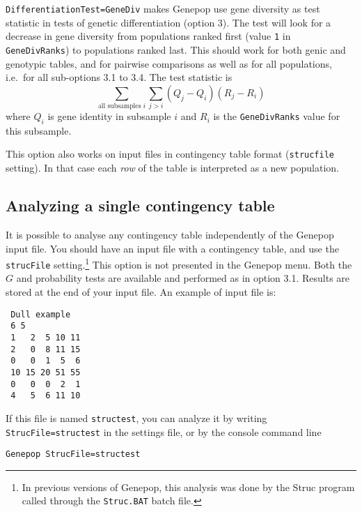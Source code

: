 \documentclass[
  12pt,
]{book}
\begin{document}
\texttt{DifferentiationTest=GeneDiv} makes Genepop use gene diversity as test statistic in tests of genetic differentiation (option 3). The test will look for a decrease in gene diversity from populations ranked first (value \texttt{1} in \texttt{GeneDivRanks}) to populations ranked last. This should work for both genic and genotypic tables, and for pairwise comparisons as well as for all populations, i.e.~for all sub-options 3.1 to 3.4. The test statistic is
\[\sum_{\textrm{all subsamples $i$}}\sum_{j>i} (Q_j-Q_i)(R_j-R_i)\]
where \(Q_i\) is gene identity in subsample \(i\) and \(R_i\) is the \texttt{GeneDivRanks} value for this subsample.


This option also works on input files in contingency table format (\texttt{strucfile} setting). In that case each \emph{row} of the table is interpreted as a new population.

\hypertarget{analyzing-a-single-contingency-table}{%
\subsection{Analyzing a single contingency table}\label{analyzing-a-single-contingency-table}}

It is possible to analyse any contingency table independently of the Genepop input file. You should have an input file with a contingency table, and use the \texttt{strucFile} setting.\footnote{In previous versions of Genepop, this analysis was done by the Struc program called through the \texttt{Struc.BAT} batch file.} This option is not presented in the Genepop menu. Both the \(G\) and probability tests are available and performed as in option 3.1. Results are stored at the end of your input file. An example of input file is:

\begin{verbatim}
 Dull example
 6 5
 1   2  5 10 11
 2   0  8 11 15
 0   0  1  5  6
 10 15 20 51 55
 0   0  0  2  1
 4   5  6 11 10
\end{verbatim}

If this file is named \texttt{structest}, you can analyze it by writing \texttt{StrucFile=structest} in the settings file, or by the console command line

\begin{verbatim}
Genepop StrucFile=structest
\end{verbatim}
\end{document}
